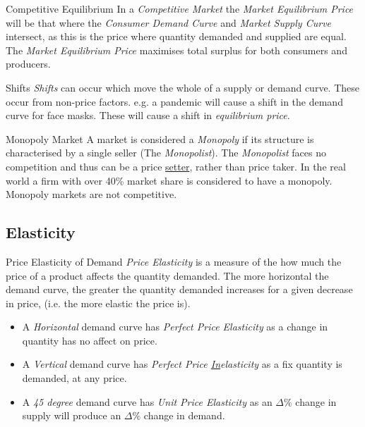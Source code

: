 \documentclass[11pt,a4paper]{article}
\begin{document}
\begin{definition}{Competitive Equilibrium}
  In a \textit{Competitive Market} the \textit{Market Equilibrium Price} will be that where the \textit{Consumer Demand Curve} and \textit{Market Supply Curve} intersect, as this is the price where quantity demanded and supplied are equal. The \textit{Market Equilibrium Price} maximises total surplus for both consumers and producers.
\end{definition}

\begin{definition}{Shifts}
  \textit{Shifts} can occur which move the whole of a supply or demand curve. These occur from non-price factors. e.g. a pandemic will cause a shift in the demand curve for face masks. These will cause a shift in  \textit{equilibrium price}.
\end{definition}

\begin{definition}{Monopoly Market}
  A market is considered a \textit{Monopoly} if its structure is characterised by a single seller (The \textit{Monopolist}). The \textit{Monopolist} faces no competition and thus can be a price \underline{setter}, rather than price taker. In the real world a firm with over 40\% market share is considered to have a monopoly. Monopoly markets are not competitive.
\end{definition}

\subsection{Elasticity}

\begin{definition}{Price Elasticity of Demand}
  \textit{Price Elasticity} is a measure of the how much the price of a product affects the quantity demanded. The more horizontal the demand curve, the greater the quantity demanded increases for a given decrease in price, (i.e. the more elastic the price is).
  \begin{itemize}
    \item A \textit{Horizontal} demand curve has \textit{Perfect Price Elasticity} as a change in quantity has no affect on price.
    \item A \textit{Vertical} demand curve has \textit{Perfect Price \underline{In}elasticity} as a fix quantity is demanded, at any price.
    \item A \textit{45 degree} demand curve has \textit{Unit Price Elasticity} as an $\Delta\%$ change in supply will produce an $\Delta\%$ change in demand.
  \end{itemize}
\end{definition}
\end{document}
